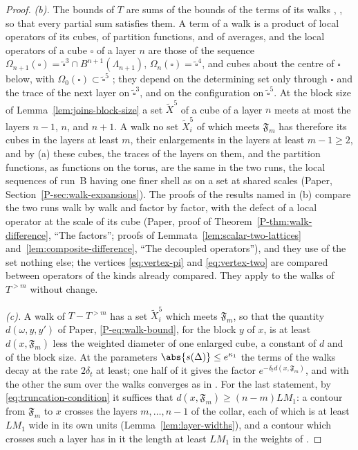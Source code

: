 \begin{proof}
\emph{(b).} The bounds of $T$ are sums of the bounds of the terms of its walks \cite[(3.107), (3.108)]{BalabanPBG}, \cite[(1.7), (1.11)]{BalabanRG2}, so that every partial sum satisfies them. A term of a walk is a product of local operators of its cubes, of partition functions, and of averages, and the local operators of a cube $\square$ of a layer $n$ are those of the sequence $\Omega_{n+1}(\square) = \tilde\square^3 \cap B^{n+1}(\Lambda_{n+1})$, $\Omega_n(\square) = \tilde\square^4$, and cubes about the centre of $\square$ below, with $\Omega_0(\square) \subset \tilde\square^5$ \cite[p.~408, l.~29--p.~409, l.~3]{BalabanPBG}; they depend on the determining set only through $\square$ and the trace of the next layer on $\tilde\square^3$, and on the configuration on $\tilde\square^5$. At the block size of Lemma~\ref{lem:joins-block-size} a set $\tilde X^5$ of a cube of a layer $n$ meets at most the layers $n - 1$, $n$, and $n + 1$. A walk no set $\tilde X^5_i$ of which meets $\mathfrak F_m$ has therefore its cubes in the layers at least $m$, their enlargements in the layers at least $m - 1 \geq 2$, and by (a) these cubes, the traces of the layers on them, and the partition functions, as functions on the torus, are the same in the two runs, the local sequences of run~B having one finer shell as on a set at shared scales (Paper, Section~\ref{P-sec:walk-expansions}). The proofs of the results named in (b) compare the two runs walk by walk and factor by factor, with the defect of a local operator at the scale of its cube (Paper, proof of Theorem~\ref{P-thm:walk-difference}, ``The factors''; proofs of Lemmata~\ref{lem:scalar-two-lattices} and~\ref{lem:composite-difference}, ``The decoupled operators''), and they use of the set nothing else; the vertices \eqref{eq:vertex-pi} and \eqref{eq:vertex-two} are compared between operators of the kinds already compared. They apply to the walks of $T^{>m}$ without change.

\emph{(c).} A walk of $T - T^{>m}$ has a set $\tilde X^5_i$ which meets $\mathfrak F_m$, so that the quantity $d(\omega, y, y')$ of Paper, \eqref{P-eq:walk-bound}, for the block $y$ of $x$, is at least $d(x, \mathfrak F_m)$ less the weighted diameter of one enlarged cube, a constant of $d$ and of the block size. At the parameters $\abs{s(\Delta)} \leq e^{\kappa_1}$ the terms of the walks decay at the rate $2\delta_t$ at least; one half of it gives the factor $e^{-\delta_td(x,\mathfrak F_m)}$, and with the other the sum over the walks converges as in \cite[Theorem~3.7]{BalabanPBG}. For the last statement, by \eqref{eq:truncation-condition} it suffices that $d(x, \mathfrak F_m) \geq (n - m)LM_1$: a contour from $\mathfrak F_m$ to $x$ crosses the layers $m, \dots, n - 1$ of the collar, each of which is at least $LM_1$ wide in its own units (Lemma~\ref{lem:layer-widths}), and a contour which crosses such a layer has in it the length at least $LM_1$ in the weights of \cite[(2.46)]{BalabanPRT2}.
\end{proof}

